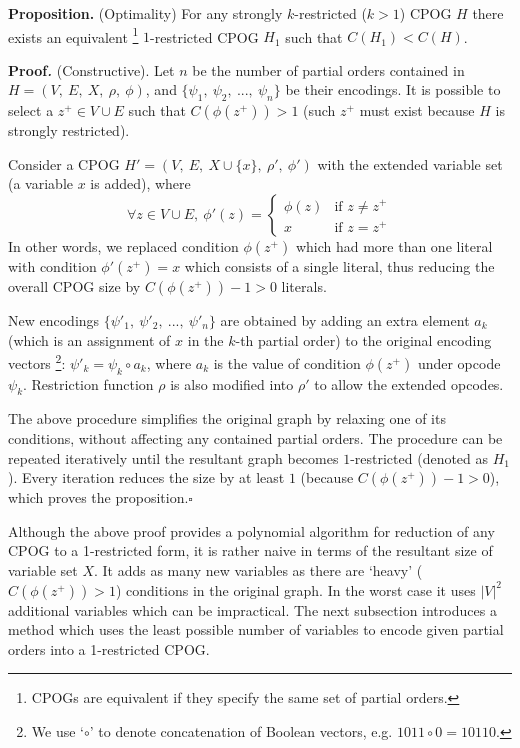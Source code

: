 \textbf{Proposition.} (Optimality) For any strongly $k$-restricted
($k>1$) CPOG $H$ there exists an equivalent%
\footnote{CPOGs are equivalent if they specify the same set of partial orders.%
} $1$-restricted CPOG $H_{1}$ such that $C(H_{1})<C(H)$.

\textbf{Proof}\textbf{\emph{.}} (Constructive). Let $n$ be the number
of partial orders contained in $H=(V,\ E,\ X,\ \rho,\ \phi)$, and
$\{\psi_{1},\ \psi_{2},\ ...,\ \psi_{n}\}$ be their encodings. It
is possible to select a $z^{+}\in V\cup E$ such that $C(\phi(z^{+}))>1$
(such $z^{+}$ must exist because $H$ is strongly restricted). 

Consider a CPOG $H'=(V,\ E,\ X\cup\{x\},\ \rho',\ \phi')$ with the
extended variable set (a variable $x$ is added), where
\[
\forall z\in V\cup E,\ \phi'(z)=\begin{cases}
\phi(z) & \text{if }z\neq z^{+}\\
x & \text{if }z=z^{+}
\end{cases}
\]
In other words, we replaced condition $\phi(z^{+})$ which had more
than one literal with condition $\phi'(z^{+})=x$ which consists of
a single literal, thus reducing the overall CPOG size by $C(\phi(z^{+}))-1>0$
literals.

New encodings $\{\psi'_{1},\ \psi'_{2},\ ...,\ \psi'_{n}\}$ are obtained
by adding an extra element $a_{k}$ (which is an assignment of $x$
in the $k$-th partial order) to the original encoding vectors%
\footnote{We use `$\circ$' to denote concatenation of Boolean vectors, e.g.
$1011\circ0=10110$.%
}: $\psi'_{k}=\psi_{k}\circ a_{k}$, where $a_{k}$ is the value of
condition $\phi(z^{+})$ under opcode $\psi_{k}$. Restriction function
$\rho$ is also modified into $\rho'$ to allow the extended opcodes.

The above procedure simplifies the original graph by relaxing one
of its conditions, without affecting any contained partial orders.
The procedure can be repeated iteratively until the resultant graph
becomes $1$-restricted (denoted as $H_{1}$). Every iteration reduces
the size by at least $1$ (because $C(\phi(z^{+}))-1>0$), which proves
the proposition.\hspace*{\fill}$\square$

Although the above proof provides a polynomial algorithm for reduction
of any CPOG to a 1-restricted form, it is rather naive in terms of
the resultant size of variable set $X$. It adds as many new variables
as there are `heavy' ($C(\phi(z^{+}))>1$) conditions in the original
graph. In the worst case it uses $|V|^{2}$ additional variables which
can be impractical. The next subsection introduces a method which
uses the least possible number of variables to encode given partial
orders into a 1-restricted CPOG.


